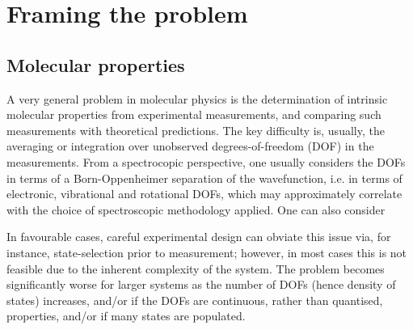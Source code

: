 \section{Framing the problem}

\subsection{Molecular properties}
A very general problem in molecular physics is the determination of intrinsic molecular properties from experimental measurements, and comparing such measurements with theoretical predictions. The key difficulty is, usually, the averaging or integration over unobserved degrees-of-freedom (DOF) in the measurements. From a spectrocopic perspective, one usually considers the DOFs in terms of a Born-Oppenheimer separation of the wavefunction, i.e. in terms of electronic, vibrational and rotational DOFs, which may approximately correlate with the choice of spectroscopic methodology applied. One can also consider 

In favourable cases, careful experimental design can obviate this issue via, for instance, state-selection prior to measurement; however, in most cases this is not feasible due to the inherent complexity of the system. The problem becomes significantly worse for larger systems as the number of DOFs (hence density of states) increases, and/or if the DOFs are continuous, rather than quantised, properties, and/or if many states are populated.